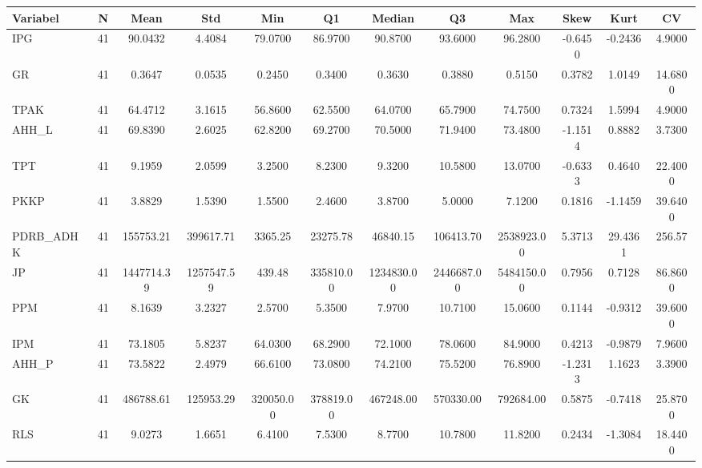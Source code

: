 \begin{adjustbox}{max width=\textwidth}
\small
\begin{tabular}{|p{2.5cm}|c|c|c|c|c|c|c|c|c|c|c|}
\hline
\textbf{Variabel} & \textbf{N} & \textbf{Mean} & \textbf{Std} & \textbf{Min} & \textbf{Q1} & \textbf{Median} & \textbf{Q3} & \textbf{Max} & \textbf{Skew} & \textbf{Kurt} & \textbf{CV} \\
\hline
IPG & 41 & 90.0432 & 4.4084 & 79.0700 & 86.9700 & 90.8700 & 93.6000 & 96.2800 & -0.6450 & -0.2436 & 4.9000 \\
GR & 41 & 0.3647 & 0.0535 & 0.2450 & 0.3400 & 0.3630 & 0.3880 & 0.5150 & 0.3782 & 1.0149 & 14.6800 \\
TPAK & 41 & 64.4712 & 3.1615 & 56.8600 & 62.5500 & 64.0700 & 65.7900 & 74.7500 & 0.7324 & 1.5994 & 4.9000 \\
AHH\_L & 41 & 69.8390 & 2.6025 & 62.8200 & 69.2700 & 70.5000 & 71.9400 & 73.4800 & -1.1514 & 0.8882 & 3.7300 \\
TPT & 41 & 9.1959 & 2.0599 & 3.2500 & 8.2300 & 9.3200 & 10.5800 & 13.0700 & -0.6333 & 0.4640 & 22.4000 \\
PKKP & 41 & 3.8829 & 1.5390 & 1.5500 & 2.4600 & 3.8700 & 5.0000 & 7.1200 & 0.1816 & -1.1459 & 39.6400 \\
PDRB\_ADHK & 41 & 155753.21 & 399617.71 & 3365.25 & 23275.78 & 46840.15 & 106413.70 & 2538923.00 & 5.3713 & 29.4361 & 256.57 \\
JP & 41 & 1447714.39 & 1257547.59 & 439.48 & 335810.00 & 1234830.00 & 2446687.00 & 5484150.00 & 0.7956 & 0.7128 & 86.8600 \\
PPM & 41 & 8.1639 & 3.2327 & 2.5700 & 5.3500 & 7.9700 & 10.7100 & 15.0600 & 0.1144 & -0.9312 & 39.6000 \\
IPM & 41 & 73.1805 & 5.8237 & 64.0300 & 68.2900 & 72.1000 & 78.0600 & 84.9000 & 0.4213 & -0.9879 & 7.9600 \\
AHH\_P & 41 & 73.5822 & 2.4979 & 66.6100 & 73.0800 & 74.2100 & 75.5200 & 76.8900 & -1.2313 & 1.1623 & 3.3900 \\
GK & 41 & 486788.61 & 125953.29 & 320050.00 & 378819.00 & 467248.00 & 570330.00 & 792684.00 & 0.5875 & -0.7418 & 25.8700 \\
RLS & 41 & 9.0273 & 1.6651 & 6.4100 & 7.5300 & 8.7700 & 10.7800 & 11.8200 & 0.2434 & -1.3084 & 18.4400 \\
\hline
\end{tabular}
\end{adjustbox}
